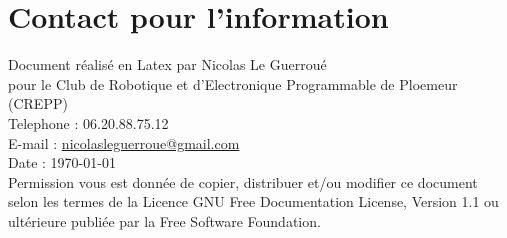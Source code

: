 
\chapter*{Contact pour l'information}

Document réalisé en Latex par Nicolas Le Guerroué \\
pour le Club de Robotique et d'Electronique Programmable de Ploemeur (CREPP) \\
Telephone : 06.20.88.75.12 \\
E-mail : \href{mailto:nicolasleguerroue@gmail.com}{nicolasleguerroue@gmail.com} \\
Date : \today \\

Permission vous est donnée de copier, distribuer et/ou modifier ce document selon les termes de 
la Licence GNU  Free Documentation License, Version 1.1 ou ultérieure publiée par 
la Free Software Foundation.



